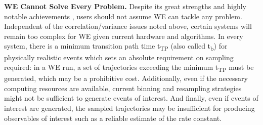 \textbf{WE Cannot Solve Every Problem.} Despite its great strengths and highly notable achievements \citep{lotz_unbiased_2018, sztain_glycan_2021, adhikari_computational_2019}, users should not assume WE can tackle any problem.
Independent of the correlation/variance issues noted above, certain systems will remain too complex for WE given current hardware and algorithms.
In every system, there is a minimum transition path time t\textsubscript{TP} (also called t\textsubscript{b}) \citep{zuckerman_transition_2002, zhang_efficient_2007} for physically realistic events which sets an absolute requirement on sampling required: in a WE run, a set of trajectories exceeding the minimum t\textsubscript{TP} must be generated, which may be a prohibitive cost.
Additionally, even if the necessary computing resources are available, current binning and resampling strategies might not be sufficient to generate events of interest. 
And finally, even if events of interest are generated, the sampled trajectories may be insufficient for producing observables of interest such as a reliable estimate of the rate constant.

\begin{comment}
\subsection{Prerequisites}

\subsubsection{Background Knowledge and Experience}

The WESTPA software is not intended for total beginners in molecular simulation. 
A prerequisite for all of WESTPA tutorials presented here is that users already have extensive experience with running standard molecular dynamics (MD) simulations using the underlying dynamics engine of interest (Amber, Gromacs, OpenMM, etc.). 
In fact, we recommend running multiple short, standard simulations prior to applying the WE strategy in order to (i) ensure that the system is prepared and the dynamics are propagated according to best practices (e.g., see \citep{Mobley2019}), (ii) identify potential progress coordinates and other observables that may be worth monitoring during the WE simulation, (iii) determine an initial definition of the target state, and (iv) estimate storage needs for your eventual WE simulation and the ns/day that can be generated for your system. 
It is also important to identify sources of validation for your simulation (e.g., from experiment and/or standard simulations) and to be familiar with the estimation of statistical uncertainty in the computed observables, including those used for validation (\citep{Grossfield2019}). 
We highly recommend that new users read the WE overview (\url{https://westpa.github.io/westpa/overview.html}) as well as a recent review article \citep{ZuckermanChong2017}. 
In addition, new users are encouraged to search the WESTPA mailing list (\url{https://groups.google.com/forum/#!forum/westpa-users}) for possible solutions or to submit questions/issues to the mailing list.
\end{comment}

